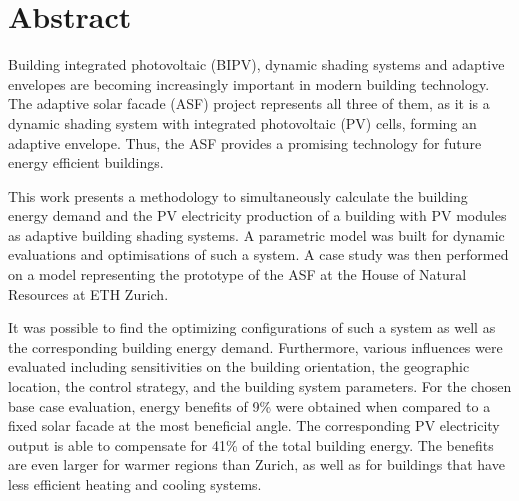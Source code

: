 \chapter*{Abstract}
Building integrated photovoltaic (BIPV), dynamic shading systems and adaptive envelopes are becoming increasingly important in modern building technology. The adaptive solar facade (ASF) project represents all three of them, as it is a dynamic shading system with integrated photovoltaic (PV) cells, forming an adaptive envelope. Thus, the ASF provides a promising technology for future energy efficient buildings. 

This work presents a methodology to simultaneously calculate the building energy demand and the PV electricity production of a building with PV modules as adaptive building shading systems. A parametric model was built for dynamic evaluations and optimisations of such a system. A case study was then performed on a model representing the prototype of the ASF at the House of Natural Resources at ETH Zurich. 

It was possible to find the optimizing configurations of such a system as well as the corresponding building energy demand. Furthermore, various influences were evaluated including sensitivities on the building orientation, the geographic location, the control strategy, and the building system parameters. For the chosen base case evaluation, energy benefits of 9\% were obtained when compared to a fixed solar facade at the most beneficial angle. The corresponding PV electricity output is able to compensate for 41\% of the total building energy. The benefits are even larger for warmer regions than Zurich, as well as for buildings that have less efficient heating and cooling systems. 
\newpage